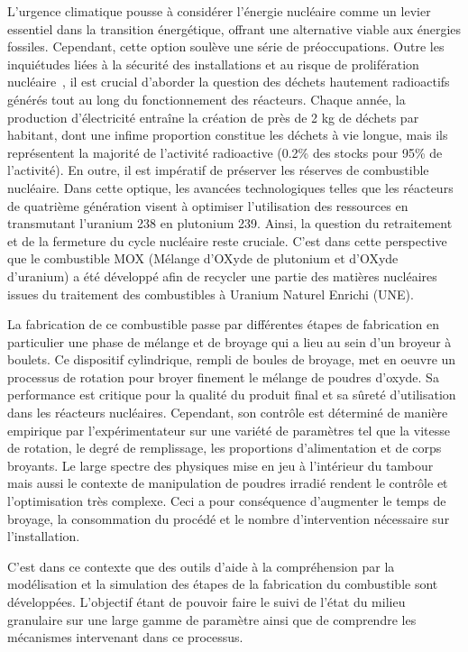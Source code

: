 L'urgence climatique pousse à considérer l'énergie nucléaire comme un levier essentiel dans la transition énergétique, offrant une alternative viable aux énergies fossiles. Cependant, cette option soulève une série de préoccupations. Outre les inquiétudes liées à la sécurité des installations et au risque de prolifération nucléaire~\cite{npt_resolution}, il est crucial d'aborder la question des déchets hautement radioactifs générés tout au long du fonctionnement des réacteurs. Chaque année, la production d'électricité entraîne la création de près de 2 kg de déchets par habitant, dont une infime proportion constitue les déchets à vie longue, mais ils représentent la majorité de l'activité radioactive (0.2\% des stocks pour 95\% de l'activité). En outre, il est impératif de préserver les réserves de combustible nucléaire. Dans cette optique, les avancées technologiques telles que les réacteurs de quatrième génération visent à optimiser l'utilisation des ressources en transmutant l'uranium 238 en plutonium 239. Ainsi, la question du retraitement et de la fermeture du cycle nucléaire reste cruciale. C'est dans cette perspective que le combustible MOX (Mélange d’OXyde de plutonium et d’OXyde d’uranium) a été développé afin de recycler une partie des matières nucléaires issues du traitement des combustibles à Uranium Naturel Enrichi (UNE).

La fabrication de ce combustible passe par différentes étapes de fabrication en particulier une phase de mélange et de broyage qui a lieu au sein d'un broyeur à boulets. Ce dispositif cylindrique, rempli de boules de broyage, met en oeuvre un processus de rotation pour broyer finement le mélange de poudres d'oxyde. Sa performance est critique pour la qualité du produit final et sa sûreté d'utilisation dans les réacteurs nucléaires. Cependant, son contrôle est déterminé de manière empirique par l'expérimentateur sur une variété de paramètres tel que la vitesse de rotation, le degré de remplissage, les proportions d'alimentation et de corps broyants. Le large spectre des physiques mise en jeu à l'intérieur du tambour mais aussi le contexte de manipulation de poudres irradié rendent le contrôle et l'optimisation très complexe. Ceci a pour conséquence d’augmenter le temps de broyage, la consommation du procédé et le nombre d’intervention nécessaire sur l’installation.

C'est dans ce contexte que des outils d'aide à la compréhension par la modélisation et la simulation des étapes de la fabrication du combustible sont développées. L'objectif étant de pouvoir faire le suivi de l'état du milieu granulaire sur une large gamme de paramètre ainsi que de comprendre les mécanismes intervenant dans ce processus.


